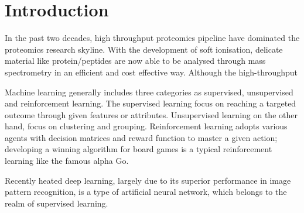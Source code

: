 \section{Introduction}

In the past two decades, high throughput proteomics pipeline have dominated the proteomics research skyline. With the development of soft ionisation, delicate material like protein/peptides are now able to be analysed through mass spectrometry in an efficient and cost effective way. Although the high-throughput   
\par 
Machine learning generally includes three categories as supervised, unsupervised and reinforcement learning. The supervised learning focus on reaching a targeted outcome through given features or attributes. Unsupervised learning on the other hand, focus on clustering and grouping. Reinforcement learning adopts various agents with decision matrices and reward function to master a given action; developing a winning algorithm for board games is a typical reinforcement learning like the famous alpha Go.
\par
Recently heated deep learning, largely due to its superior performance in image pattern recognition, is a type of artificial neural network, which belongs to the realm of supervised learning. 
